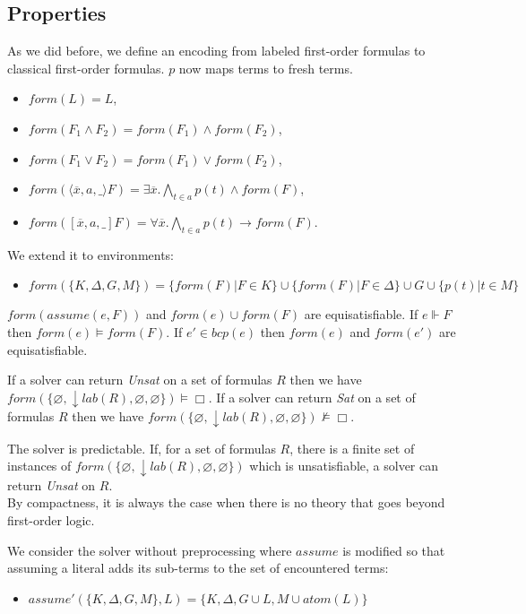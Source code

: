 \documentclass[a4paper,11pt]{article}
\newcommand{\atom}{\mathit{atom}}
\newcommand{\F}{\mathit{form}}
\newcommand{\T}{\mathit{lab}}
\newcommand{\A}{\mathit{assume}}
\newcommand{\B}{\mathit{bcp}}
\begin{document}
\subsection{Properties}
As we did before, we define an encoding from labeled first-order formulas to classical
first-order formulas. $p$ now maps terms to fresh terms.
\begin{itemize}
 \item $\F(L)=L$,
 \item $\F(F_1\wedge F_2)=\F(F_1)\wedge\F(F_2)$,
 \item $\F(F_1\vee F_2)=\F(F_1)\vee\F(F_2)$,
 \item $\F(\langle\overline x,a,\_\rangle F)=\exists\overline x.\bigwedge_{t\in a} p(t)\wedge\F(F)$,
 \item $\F([\overline x,a,\_]F)=\forall \overline x.\bigwedge_{t\in a} p(t)\rightarrow\F(F)$.
\end{itemize}
We extend it to environments:
\begin{itemize}
 \item $\F(\{K,\Delta,G,M\})=\{\F(F)|F\in K\}\cup\{\F(F)|F\in\Delta\}\cup G\cup\{p(t)|t\in M\}$
\end{itemize}
{\lemma $\F(\A(e,F))$ and $\F(e)\cup\F(F)$ are equisatisfiable.}
{\lemma If $e\Vdash F$ then $\F(e)\vDash\F(F)$.}
{\lemma If $e'\in\B(e)$ then $\F(e)$ and $\F(e')$ are equisatisfiable.}

{\theorem If a solver can return \emph{Unsat} on a set of formulas $R$ then we have
$\F(\{\varnothing,\downarrow\T(R),\varnothing,\varnothing\})\vDash\Box$.}
{\theorem If a solver can return \emph{Sat} on a set of formulas $R$ then we have
$\F(\{\varnothing,\downarrow\T(R),\varnothing,\varnothing\})\nvDash\Box$.}

{\corollary The solver is predictable.}
{\theorem If, for a set of formulas $R$, there is a finite set of instances of
$\F(\{\varnothing,\downarrow\T(R),\varnothing,\varnothing\})$ which is unsatisfiable,
a solver can return \emph{Unsat} on $R$.}\\
By compactness, it is always the case when there is no theory that goes
beyond first-order logic.

We consider the solver without preprocessing where $\A$ is modified so that
assuming a literal adds its sub-terms to the set of encountered terms:
\begin{itemize}
 \item $\A'(\{K,\Delta,G,M\},L) = \{K,\Delta,G\cup L, M\cup\atom(L)\}$
\end{itemize}
\end{document}
